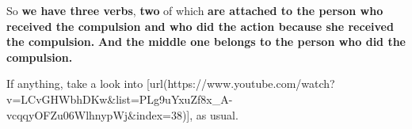 \thinrule

So {\bf we have three verbs}, {\bf two} of which {\bf are attached to the person who received the compulsion and who did the action because she received the compulsion.} {\bf And the middle one belongs to the person who did the compulsion.}

If anything, take a look into [url(https://www.youtube.com/watch?v=LCvGHWbhDKw&list=PLg9uYxuZf8x_A-vcqqyOFZu06WlhnypWj&index=38)], as usual.

\stopsectionlevel

\stopsectionlevel

